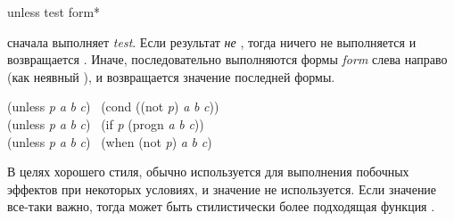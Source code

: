 \begin{defmac}
unless test {form}*

сначала выполняет \emph{test}. Если результат \emph{не} {\false}, тогда ничего не
выполняется и возвращается {\false}.
Иначе, последовательно выполняются формы \emph{form}
слева направо (как неявный ), и возвращается значение последней
формы.
\begin{lisp}
(unless \emph{p} \emph{a} \emph{b} \emph{c}) \EQ\ (cond ((not \emph{p}) \emph{a} \emph{b} \emph{c})) \\
(unless \emph{p} \emph{a} \emph{b} \emph{c}) \EQ\ (if \emph{p} {\false} (progn \emph{a} \emph{b} \emph{c})) \\
(unless \emph{p} \emph{a} \emph{b} \emph{c}) \EQ\ (when (not \emph{p}) \emph{a} \emph{b} \emph{c})
\end{lisp}
В целях хорошего стиля,  обычно используется для выполнения побочных
эффектов при некоторых условиях, и значение  не используется.
Если значение все-таки важно, тогда может быть стилистически более подходящая
функция .
\end{defmac}

